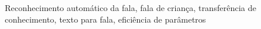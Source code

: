 \acresetall

\noindent Reconhecimento automático da fala, fala de criança, transferência de conhecimento, texto para fala, eficiência de parâmetros